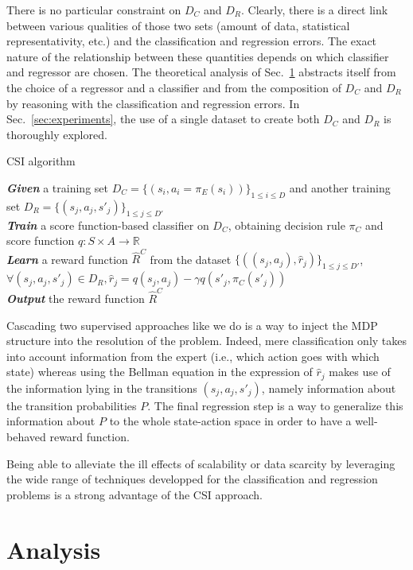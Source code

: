 \documentclass[smallextended]{svjour3}
\begin{document}
There is no particular constraint on $D_C$ and $D_R$. Clearly, there is a direct link between various qualities of those two sets (amount of data, statistical representativity, etc.) and the classification and regression errors. The exact nature of the relationship between these quantities depends on which classifier and regressor are chosen. The theoretical analysis of Sec.~\ref{sec:analysis} abstracts itself from the choice of a regressor and a classifier and from the composition of $D_C$ and $D_R$ by reasoning with the classification and regression errors. In Sec.~\ref{sec:experiments}, %
the use of a single dataset to create both $D_C$ and $D_R$ is thoroughly explored.
\begin{algorithm}%
  \caption{CSI algorithm}
  \label{algo:cascading}
  \emph{\textbf{Given}} a training set $D_C=\{(s_i,a_i=\pi_E(s_i))\}_{1\leq i \leq D}$ and another training set $D_R=\{(s_{j},a_{j},s'_{j})\}_{1\leq j \leq D'}$\;\\
  \emph{\textbf{Train}} a score function-based classifier on $D_C$, obtaining decision rule $\pi_C$ and score function $q:S\times A \rightarrow \mathbb R$\;\\
  \emph{\textbf{Learn}} a reward function $\hat R^C$ from the dataset $\{((s_{j},a_{j}),\hat{r}_j)\}_{1\leq j \leq D'}$, $\forall (s_j,a_j,s'_j) \in D_R,\hat{r}_j=q(s_{j},a_{j})-\gamma q(s'_{j},\pi_C(s'_{j}))$\;\\
  \emph{\textbf{Output}} the reward function $\hat R^{C}$ \;
\end{algorithm}

Cascading two supervised approaches like we do is a way to inject the MDP structure into the resolution of the problem. Indeed, mere classification only takes into account information from the expert (i.e., which action goes with which state) whereas using the Bellman equation in the expression of $\hat r_j$ makes use of the information lying in the transitions $(s_j,a_j,s'_j)$, namely information about the transition probabilities $P$. The final regression step is a way to generalize this information about $P$ to the whole state-action space in order to have a well-behaved reward function.

Being able to alleviate the ill effects of scalability or data scarcity by leveraging the wide range of techniques developped for the classification and regression problems is a strong advantage of the CSI approach.

\section{Analysis}
\label{sec:analysis}
\end{document}
